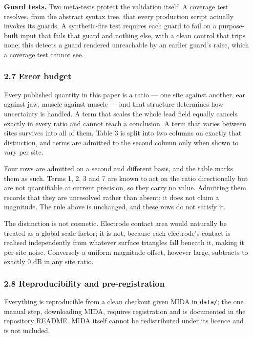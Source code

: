 \documentclass[
  11pt,
]{article}
\newcounter{none} %
\begin{document}
\textbf{Guard tests.} Two meta-tests protect the validation itself. A coverage test
resolves, from the abstract syntax tree, that every production script actually
invokes its guards. A synthetic-fire test requires each guard to fail on a
purpose-built input that fails that guard and nothing else, with a clean control
that trips none; this detects a guard rendered unreachable by an earlier guard's
raise, which a coverage test cannot see.

\subsubsection{2.7 Error budget}\label{error-budget}

Every published quantity in this paper is a ratio --- one site against another,
ear against jaw, muscle against muscle --- and that structure determines how
uncertainty is handled. A term that scales the whole lead field equally cancels
exactly in every ratio and cannot reach a conclusion. A term that varies between
sites survives into all of them. Table 3 is split into two columns on exactly
that distinction, and terms are admitted to the second column only when shown to
vary per site.

Four rows are admitted on a second and different basis, and the table marks them
as such. Terms 1, 2, 3 and 7 are known to act on the ratio directionally but are
not quantifiable at current precision, so they carry no value. Admitting them
records that they are unresolved rather than absent; it does not claim a
magnitude. The rule above is unchanged, and these rows do not satisfy it.

The distinction is not cosmetic. Electrode contact area would naturally be
treated as a global scale factor; it is not, because each electrode's contact is
realised independently from whatever surface triangles fall beneath it, making
it per-site noise. Conversely a uniform magnitude offset, however large,
subtracts to exactly 0 dB in any site ratio.

\subsubsection{2.8 Reproducibility and pre-registration}\label{reproducibility-and-pre-registration}

Everything is reproducible from a clean checkout given MIDA in \texttt{data/}; the one
manual step, downloading MIDA, requires registration and is documented in the
repository README. MIDA itself cannot be redistributed under its licence and is
not included.
\end{document}
